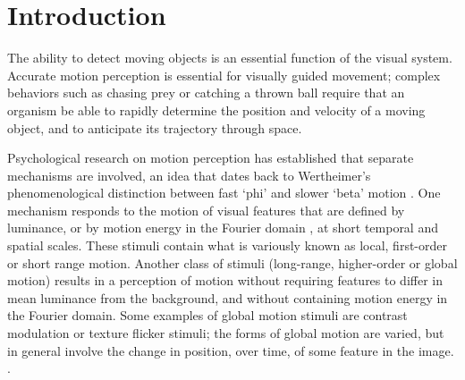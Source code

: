 \documentclass[manuscript]{subfiles}
\begin{document}
\section[Introduction]{Introduction}\label{sec:introduction}

The ability to detect moving objects is an essential function of the visual system. Accurate motion perception is essential for visually guided movement; complex behaviors such as chasing prey or catching a thrown ball require that an organism be able to rapidly determine the position and velocity of a moving object, and to anticipate its trajectory through space.

Psychological research on motion perception has established that separate mechanisms are involved, an idea that dates back to Wertheimer's phenomenological distinction between fast `phi' and slower `beta' motion \citep{Steinman:2000ap}. One mechanism responds to the motion of visual features that are defined by luminance, or by motion energy in the Fourier domain \citep{Adelson:1985ea}, at short temporal and spatial scales. These stimuli contain what is variously known as local, first-order or short range motion. Another class of stimuli (long-range, higher-order or global motion) results in a perception of motion without requiring features to differ in mean luminance from the background, and without containing motion energy in the Fourier domain. Some examples of global motion stimuli are contrast modulation or texture flicker stimuli; the forms of global motion are varied, but in general involve the change in position, over time, of some feature in the image. \citep{Lu:1995la}.

\end{document}

